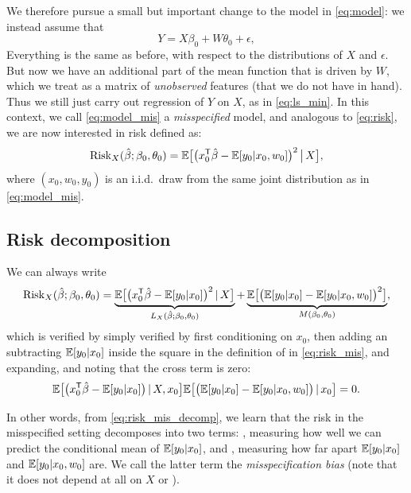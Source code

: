 \documentclass{article}
\begin{document}
We therefore pursue a small but important change to the model in
\eqref{eq:model}: we instead assume that    
\begin{equation}
\label{eq:model_mis}
Y = X\beta_0 + W\theta_0 + \epsilon,
\end{equation}
Everything is the same as before, with respect to the distributions of $X$ and
$\epsilon$. But now we have an additional part of the mean function that is
driven by $W$, which we treat as a matrix of \emph{unobserved} features (that we 
do not have in hand). Thus we still just carry out regression of $Y$ on $X$, as
in \eqref{eq:ls_min}. In this context, we call \eqref{eq:model_mis} a
\emph{misspecified} model, and analogous to \eqref{eq:risk}, we are now
interested in risk defined as:
\begin{equation}
\label{eq:risk_mis}
\mathrm{Risk}_X(\hat{\beta}; \beta_0, \theta_0) = \mathbb{E} \big[ \big( x_0^{\mathsf{T}} \hat{\beta} -
\mathbb{E}[y_0|x_0,w_0] \big)^2 \,\big|\, X \big],
\end{equation}
where $(x_0,w_0,y_0)$ is an i.i.d.\ draw from the same joint distribution as in 
\eqref{eq:model_mis}. 

\subsection{Risk decomposition} 

We can always write 
\begin{equation}
\label{eq:risk_mis_decomp}
\mathrm{Risk}_X(\hat{\beta}; \beta_0, \theta_0) = 
\underbrace{\mathbb{E} \big[ \big( x_0^{\mathsf{T}} \hat{\beta} - \mathbb{E}[y_0|x_0] \big)^2 \,|\, X 
  \big]}_{L_X(\hat{\beta}; \beta_0, \theta_0)} +
\underbrace{\mathbb{E} \big[ \big( \mathbb{E}[y_0|x_0] - \mathbb{E}[y_0|x_0,w_0] \big)^2
  \big]}_{M(\beta_0, \theta_0)}, 
\end{equation}
which is verified by simply verified by first conditioning on $x_0$, then adding
an subtracting $\mathbb{E}[y_0|x_0]$ inside the square in the definition of
 in \eqref{eq:risk_mis}, and expanding, 
and noting that the cross term is zero:   
\[
\mathbb{E} \big[ \big( x_0^{\mathsf{T}} \hat{\beta} - \mathbb{E}[y_0|x_0] \big) \,|\, X,x_0 \big]
\mathbb{E} \big[\big( \mathbb{E}[y_0|x_0] - \mathbb{E}[y_0|x_0,w_0] \big) \,|\, x_0 \big] = 0.
\]

In other words, from \eqref{eq:risk_mis_decomp}, we learn that the risk in the
misspecified setting decomposes into two terms: , measuring how well we can predict the conditional mean of
$\mathbb{E}[y_0|x_0]$, and , measuring how far
apart $\mathbb{E}[y_0|x_0]$ and $\mathbb{E}[y_0|x_0,w_0]$ are. We call the latter term the
\emph{misspecification bias} (note that it does not depend at all on $X$ or
\smash{$\hbeta$}).   
\end{document}
